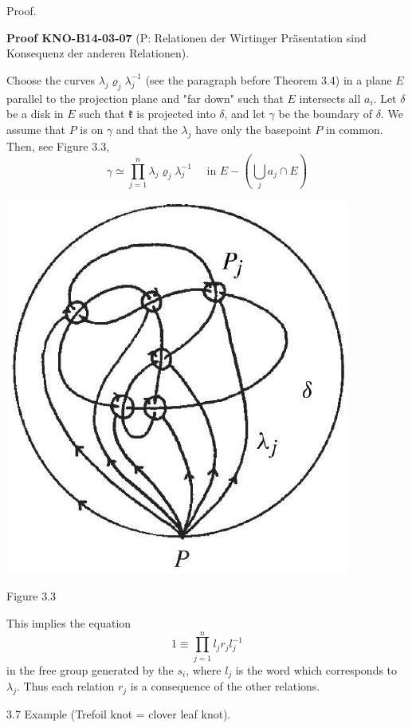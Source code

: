\documentclass[10pt, letterpaper]{article}
\newcommand{\CustomHeading}[3]{%
  \par\medskip\noindent%
  \textbf{#1 #2} \textnormal{(#3)}.\enskip%
}
\newenvironment{PROOF}[2]{\begin{unitbox}\CustomHeading{Proof}{#1}{#2}}{\end{unitbox}}
\begin{document}
Proof. 

\begin{PROOF}{KNO-B14-03-07}{P: Relationen der Wirtinger Präsentation sind Konsequenz der anderen Relationen}
Choose the curves $\lambda_{j} \varrho_{j} \lambda_{j}^{-1}$ (see the paragraph before Theorem 3.4) in a plane $E$ parallel to the projection plane and "far down" such that $E$ intersects all $a_{i}$. Let $\delta$ be a disk in $E$ such that $\mathfrak{k}$ is projected into $\delta$, and let $\gamma$ be the boundary of $\delta$. We assume that $P$ is on $\gamma$ and that the $\lambda_{j}$ have only the basepoint $P$ in common. Then, see Figure 3.3,
$$
\gamma \simeq \prod_{j=1}^{n} \lambda_{j} \varrho_{j} \lambda_{j}^{-1} \quad \text { in } E-\left(\bigcup_{j} a_{j} \cap E\right)
$$
\begin{center}
\includegraphics[scale=0.2]{2025_05_21_9c06be8de7a55410f8c1g-049}
\end{center}
Figure 3.3

This implies the equation
$$
1 \equiv \prod_{j=1}^{n} l_{j} r_{j} l_{j}^{-1}
$$
in the free group generated by the $s_{i}$, where $l_{j}$ is the word which corresponds to $\lambda_{j}$. Thus each relation $r_{j}$ is a consequence of the other relations.
\end{PROOF}



3.7 Example (Trefoil knot = clover leaf knot). 
\end{document}
